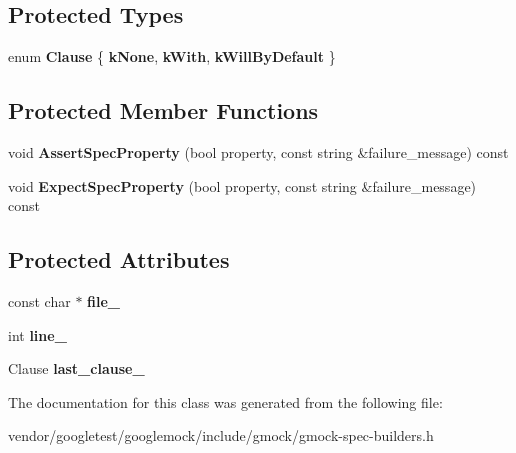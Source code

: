 \subsection*{Protected Types}
\begin{DoxyCompactItemize}
\item 
enum {\bfseries Clause} \{ {\bfseries k\+None}, 
{\bfseries k\+With}, 
{\bfseries k\+Will\+By\+Default}
 \}\hypertarget{classtesting_1_1internal_1_1UntypedOnCallSpecBase_a78ebf16bfee40375e33a983f3100f354}{}\label{classtesting_1_1internal_1_1UntypedOnCallSpecBase_a78ebf16bfee40375e33a983f3100f354}

\end{DoxyCompactItemize}
\subsection*{Protected Member Functions}
\begin{DoxyCompactItemize}
\item 
void {\bfseries Assert\+Spec\+Property} (bool property, const string \&failure\+\_\+message) const \hypertarget{classtesting_1_1internal_1_1UntypedOnCallSpecBase_aa0eb811082c71f44a696a14f662b14b5}{}\label{classtesting_1_1internal_1_1UntypedOnCallSpecBase_aa0eb811082c71f44a696a14f662b14b5}

\item 
void {\bfseries Expect\+Spec\+Property} (bool property, const string \&failure\+\_\+message) const \hypertarget{classtesting_1_1internal_1_1UntypedOnCallSpecBase_a9df045539c850fc4ba04d2ca02602335}{}\label{classtesting_1_1internal_1_1UntypedOnCallSpecBase_a9df045539c850fc4ba04d2ca02602335}

\end{DoxyCompactItemize}
\subsection*{Protected Attributes}
\begin{DoxyCompactItemize}
\item 
const char $\ast$ {\bfseries file\+\_\+}\hypertarget{classtesting_1_1internal_1_1UntypedOnCallSpecBase_adf4e6c5022dfeb482f5328e9bb58ba88}{}\label{classtesting_1_1internal_1_1UntypedOnCallSpecBase_adf4e6c5022dfeb482f5328e9bb58ba88}

\item 
int {\bfseries line\+\_\+}\hypertarget{classtesting_1_1internal_1_1UntypedOnCallSpecBase_a1dfa0dafaae6697f17adf5d837ca77c7}{}\label{classtesting_1_1internal_1_1UntypedOnCallSpecBase_a1dfa0dafaae6697f17adf5d837ca77c7}

\item 
Clause {\bfseries last\+\_\+clause\+\_\+}\hypertarget{classtesting_1_1internal_1_1UntypedOnCallSpecBase_adb6d19adfeb5fde535d854aedbc5fb0f}{}\label{classtesting_1_1internal_1_1UntypedOnCallSpecBase_adb6d19adfeb5fde535d854aedbc5fb0f}

\end{DoxyCompactItemize}


The documentation for this class was generated from the following file\+:\begin{DoxyCompactItemize}
\item 
vendor/googletest/googlemock/include/gmock/gmock-\/spec-\/builders.\+h\end{DoxyCompactItemize}
